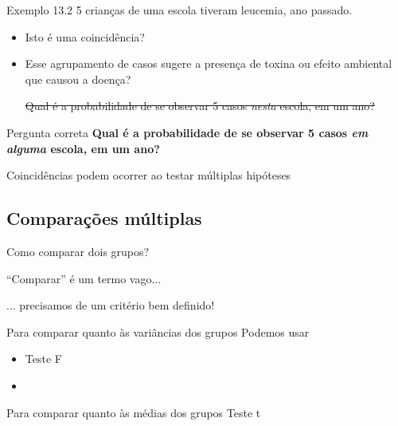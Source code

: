 \documentclass{beamer}
\begin{document}
\begin{frame}{\scriptsize }
  \begin{exampleblock}{Exemplo 13.2}
    \footnotesize
    5 crianças de uma escola tiveram leucemia, ano passado.

    \begin{itemize}
      \footnotesize
    \item Isto é uma coincidência?
    \item Esse agrupamento de casos sugere a presença de toxina ou efeito ambiental que causou a doença?

      \bigskip
      \begin{exampleblock}{}
        \footnotesize
      \sout{Qual é a probabilidade de se observar 5 casos {\em nesta} escola, em um ano?}
    \end{exampleblock}

    \end{itemize}
  \end{exampleblock}
  \begin{exampleblock}{Pergunta correta}
    \footnotesize
    {\bf Qual é a probabilidade de se observar 5 casos {\em em alguma} escola, em um ano?}
  \end{exampleblock}
\end{frame}

\begin{frame}{\scriptsize }
  \begin{center}
    Coincidências podem ocorrer ao testar múltiplas hipóteses
  \end{center}
\end{frame}

\subsection{Comparações múltiplas}

\begin{frame}{\scriptsize Como comparar dois grupos?}
  \begin{center}
    \small
    ``Comparar'' é um termo vago...

    \bigskip
    ... precisamos de um critério bem definido!
  \end{center}
  \bigskip
  \begin{block}{Para comparar quanto às variâncias dos grupos}
    \footnotesize
    Podemos usar
    \begin{itemize}
      \footnotesize
    \item Teste F
    \item<0>
    \end{itemize}
  \end{block}
  \bigskip
  \begin{block}{Para comparar quanto às médias dos grupos}
    \footnotesize
    Teste t
  \end{block}
\end{frame}
\end{document}

